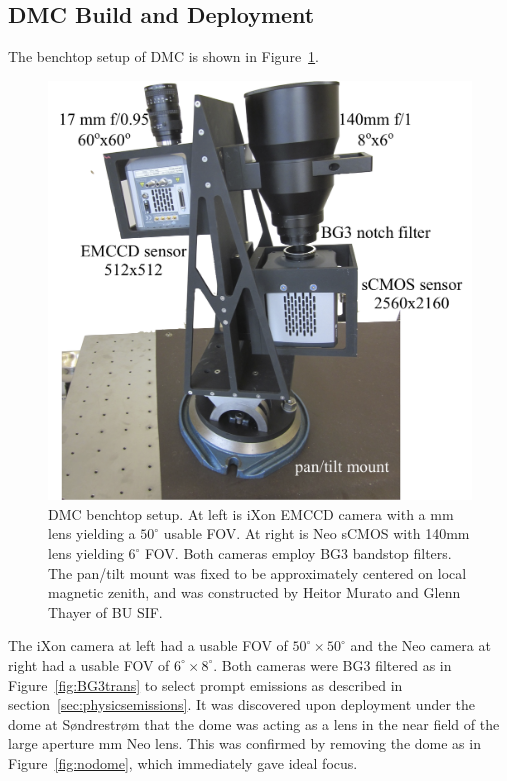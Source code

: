\FloatBarrier
\subsection{DMC Build and Deployment}
The benchtop setup of DMC is shown in Figure~\ref{fig:dmcbench}.
\begin{figure}\centering
	\includegraphics[width=\linewidth]{gfx/DMC_bench1}
	\caption{DMC benchtop setup. 
		At left is iXon EMCCD camera with a \unit[17]{mm} lens yielding a $50^\circ$ usable FOV. 
		At right is Neo sCMOS with 140mm lens yielding $6^\circ$ FOV. 
		Both cameras employ BG3 bandstop filters.
		The pan/tilt mount was fixed to be approximately centered on local magnetic zenith, and was constructed by Heitor Murato and Glenn Thayer of BU SIF.}
	\label{fig:dmcbench}
\end{figure}
The iXon camera at left had a usable FOV of $50^\circ \times 50^\circ$ and the Neo camera at right had a usable FOV of $6^\circ \times 8^\circ$.
Both cameras were BG3 filtered as in Figure~\ref{fig:BG3trans} to select prompt emissions as described in section~\ref{sec:physicsemissions}.
It was discovered upon deployment under the dome at Søndrestrøm that the dome was acting as a lens in the near field of the large aperture \unit[140]{mm} Neo lens.
This was confirmed by removing the dome as in Figure~\ref{fig:nodome}, which immediately gave ideal focus.
